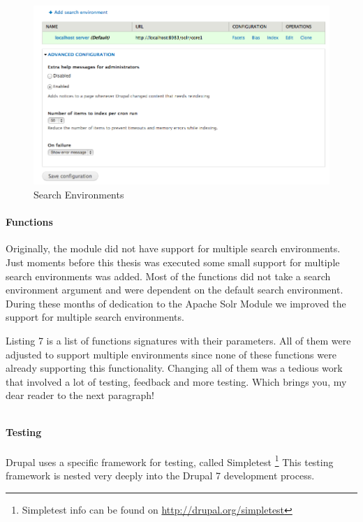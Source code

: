 \begin{figure}[H]
     \includegraphics[width=\textwidth]{images/implementation/search_environments.png}
     \caption{Search Environments}
\end{figure}

\paragraph{Functions}
Originally, the module did not have support for multiple search environments. Just moments before this thesis was executed some small support for multiple search environments was added. Most of the functions did not take a search environment argument and were dependent on the default search environment. During these months of dedication to the Apache Solr Module we improved the support for multiple search environments. 

Listing 7 is a list of functions signatures with their parameters. All of them were adjusted to support multiple environments since none of these functions were already supporting this functionality. Changing all of them was a tedious work that involved a lot of testing, feedback and more testing. Which brings you, my dear reader to the next paragraph!
\inputminted[fontsize=\scriptsize,linenos]{php}{./code_examples/functions_environments.php}

\paragraph{Testing}
Drupal uses a specific framework for testing, called Simpletest \footnote{Simpletest info can be found on \url{http://drupal.org/simpletest}} This testing framework is nested very deeply into the Drupal 7 development process. 

